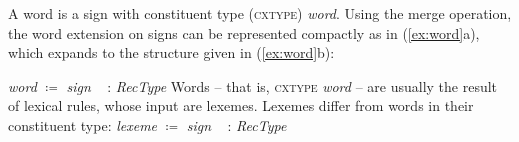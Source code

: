 \documentclass[output=paper
 	        ,biblatex
                ,babelshorthands
                ,newtxmath
                ,draftmode
                ,colorlinks, citecolor=brown
]{langscibook}
\begin{document}
\avm{
[dgb-params & : $R_1$\\
cont & = [q-params & : $R_0$] ]
}
\z



A word is a sign with constituent type (\textsc{cxtype}) \emph{word}.
%
Using the merge operation, the word extension on signs can be represented compactly as in (\ref{ex:word}a), which expands to the structure given in (\ref{ex:word}b):
%

\ea \label{ex:word}
\ea \emph{word} $\coloneqq$ \emph{sign} \ttrmerge\
 : \emph{RecType}
\ex 
{}
\z
\z
%
Words -- that is, \textsc{cxtype} \emph{word} -- are usually the result of lexical rules, whose input are lexemes.
%
Lexemes differ from words in their constituent type:
%
\ea
\emph{lexeme} $\coloneqq$ \emph{sign} \ttrmerge\
: \emph{RecType}
\z
\end{document}
